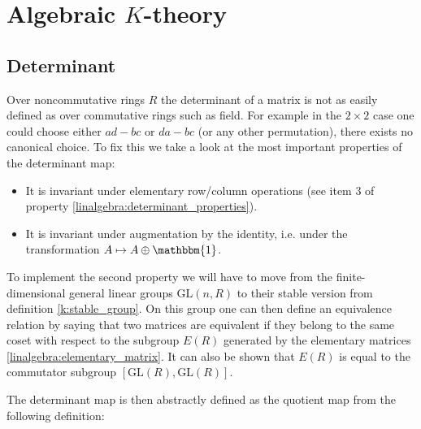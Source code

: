 {\section{\texorpdfstring{Algebraic $K$-theory}{Algebraic K-theory}}
\subsection{Determinant}

    Over noncommutative rings $R$ the determinant of a matrix is not as easily defined as over commutative rings such as field. For example in the $2\times2$ case one could choose either $ad-bc$ or $da-bc$ (or any other permutation), there exists no canonical choice. To fix this we take a look at the most important properties of the determinant map:
    \begin{itemize}
        \item It is invariant under elementary row/column operations (see item 3 of property \ref{linalgebra:determinant_properties}).
        \item It is invariant under augmentation by the identity, i.e. under the transformation $A\mapsto A\oplus\mathbbm{1}$.
    \end{itemize}
    To implement the second property we will have to move from the finite-dimensional general linear groups $\text{GL}(n, R)$ to their stable version from definition \ref{k:stable_group}. On this group one can then define an equivalence relation by saying that two matrices are equivalent if they belong to the same coset with respect to the subgroup $E(R)$ generated by the elementary matrices \ref{linalgebra:elementary_matrix}. It can also be shown that $E(R)$ is equal to the commutator subgroup $[\text{GL}(R), \text{GL}(R)]$.

    The determinant map is then abstractly defined as the quotient map from the following definition:

}
